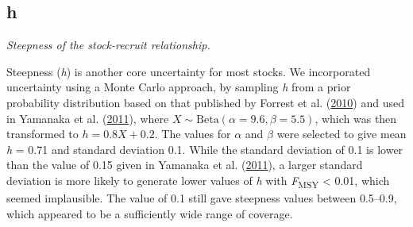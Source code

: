 \documentclass[11pt]{book}
\newenvironment{Shaded}{\begin{snugshade}}{\end{snugshade}}
\newcommand{\CommentTok}[1]{\textcolor[rgb]{0.56,0.35,0.01}{\textit{#1}}}
\newcommand{\ControlFlowTok}[1]{\textcolor[rgb]{0.13,0.29,0.53}{\textbf{#1}}}
\newcommand{\DecValTok}[1]{\textcolor[rgb]{0.00,0.00,0.81}{#1}}
\newcommand{\FloatTok}[1]{\textcolor[rgb]{0.00,0.00,0.81}{#1}}
\newcommand{\KeywordTok}[1]{\textcolor[rgb]{0.13,0.29,0.53}{\textbf{#1}}}
\newcommand{\NormalTok}[1]{#1}
\newcommand{\OperatorTok}[1]{\textcolor[rgb]{0.81,0.36,0.00}{\textbf{#1}}}
\newcommand{\StringTok}[1]{\textcolor[rgb]{0.31,0.60,0.02}{#1}}
\begin{document}
\subsection{h}

\emph{Steepness of the stock-recruit relationship.}

Steepness (\emph{h}) is another core uncertainty for most stocks. We incorporated uncertainty using a Monte Carlo approach, by sampling \emph{h} from a prior probability distribution based on that published by Forrest et al. (\protect\hyperlink{ref-forrest2010}{2010}) and used in Yamanaka et al. (\protect\hyperlink{ref-yamanaka2011}{2011}), where \(X \sim \textrm{Beta}(\alpha = 9.6, \beta = 5.5)\), which was then transformed to \(h = 0.8 X + 0.2\). The values for \(\alpha\) and \(\beta\) were selected to give mean \emph{h} = 0.71 and standard deviation 0.1. While the standard deviation of 0.1 is lower than the value of 0.15 given in Yamanaka et al. (\protect\hyperlink{ref-yamanaka2011}{2011}), a larger standard deviation is more likely to generate lower values of \emph{h} with \emph{F}\textsubscript{MSY} \textless{} 0.01, which seemed implausible. The value of 0.1 still gave steepness values between 0.5--0.9, which appeared to be a sufficiently wide range of coverage.
\begin{Shaded}
\end{Shaded}
\end{document}
